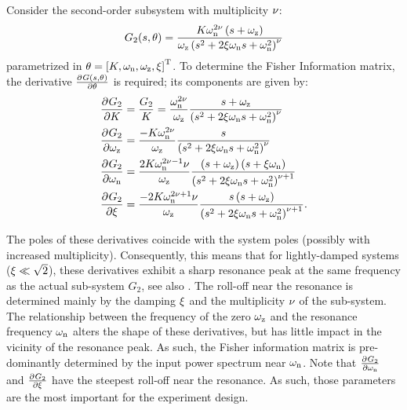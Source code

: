 Consider the second-order subsystem with multiplicity $\nu_{}$:
\begin{equation}
  G_2(s, \theta) = \frac{K_{} \omega_{\mathrm{n}}^{2 \nu_{}} \left( s + \omega_{\mathrm{z}} \right)}{\omega_{\mathrm{z}} \left(s^2 + 2 \xi_{} \omega_{\mathrm{n}} s + \omega_{\mathrm{n}}^2 \right)^{\nu_{}}}
\label{eq:excitation:secondOrderSubsystem}
\end{equation}
parametrized in $\theta =  \left[K, \omega_{\mathrm{n}}, \omega_{\mathrm{z}}, \xi_{} \right]^{\mathrm{T}}$.
To determine the Fisher Information matrix, the derivative $\frac{{\partial}^{} G(s,\theta)}{\partial \theta}$ is required; its components are given by:
\begin{align}
  \frac{{\partial}^{} G_2}{\partial K_{}} 
    &= 
    \frac{G_2}{K_{}}
    =
  \frac{\omega_{\mathrm{n}}^{2\nu_{}}}{\omega_{\mathrm{z}}}
  \frac{s + \omega_{\mathrm{z}}}{\left(s^2 + 2 \xi_{} \omega_{\mathrm{n}} s + \omega_{\mathrm{n}}^2\right)^{\nu_{}}}
  \\
  \frac{{\partial}^{} G_2}{\partial \omega_{\mathrm{z}}} 
    &= 
    \frac{-K_{} \omega_{\mathrm{n}}^{2\nu_{}}}
              {\omega_{\mathrm{z}}} 
    \frac{s}
              {\left(s^2 + 2 \xi_{} \omega_{\mathrm{n}} s + \omega_{\mathrm{n}}^2\right)^{\nu_{}}} 
  \\
  \frac{{\partial}^{} G_2}{\partial \omega_{\mathrm{n}}} 
  &= 
  \frac{2 K_{} \omega_{\mathrm{n}}^{2\nu_{}-1} \nu_{}}
            {\omega_{\mathrm{z}}} 
  \frac{\left( s + \omega_{\mathrm{z}} \right) \left( s+ \xi_{} \omega_{\mathrm{n}} \right)}
            {\left( s^2 + 2 \xi_{} \omega_{\mathrm{n}} s + \omega_{\mathrm{n}}^2 \right)^{\nu_{} + 1}}
  \\
  \frac{{\partial}^{} G_2}{\partial \xi_{}}
  &= 
  \frac{-2 K_{} \omega_{\mathrm{n}}^{2\nu_{} + 1} \nu_{}}
            {\omega_{\mathrm{z}}}
  \frac{s \left( s + \omega_{\mathrm{z}} \right)}
             {\left( s^2 + 2 \xi_{} \omega_{\mathrm{n}} s + \omega_{\mathrm{n}}^2 \right)^{\nu_{} + 1}}
  \text{.}
\end{align}

The poles of these derivatives coincide with the system poles (possibly with increased multiplicity).
Consequently, this means that for lightly-damped systems ($\xi_{} \ll \sqrt{2}$), these derivatives exhibit a sharp resonance peak at the same frequency as the actual sub-system $G_2$, see also .
The roll-off near the resonance is determined mainly by the damping $\xi_{}$ and the multiplicity $\nu_{}$ of the sub-system.
The relationship between the frequency of the zero $\omega_{\mathrm{z}}$ and the resonance frequency $\omega_{\mathrm{n}}$ alters the shape of these derivatives, but has little impact in the vicinity of the resonance peak.
As such, the Fisher information matrix is pre-dominantly determined by the input power spectrum near $\omega_{\mathrm{n}}$.
Note that $\frac{{\partial}^{} G_2}{\partial \omega_{\mathrm{n}}}$ and $\frac{{\partial}^{} G_2}{\partial \xi_{}}$ have the steepest roll-off near the resonance.
As such, those parameters are the most important for the experiment design.

